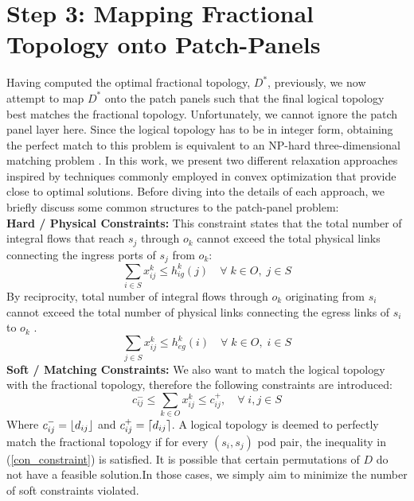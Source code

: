 \documentclass[sigconf]{acmart}
\theoremstyle{definition}
\begin{document}
\section{Step 3: Mapping Fractional Topology onto Patch-Panels}\label{section_patch_panel_mapping}
Having computed the optimal fractional topology, $D^*$, previously, we now attempt to map $D^*$ onto the patch panels such that the final logical topology best matches the fractional topology. Unfortunately, we cannot ignore the patch panel layer here. Since the logical topology has to be in integer form, obtaining the perfect match to this problem is equivalent to an NP-hard three-dimensional matching problem \cite{irving1994three, foerster2018characterizing}. In this work, we present two different relaxation approaches inspired by techniques commonly employed in convex optimization that provide close to optimal solutions. Before diving into the details of each approach, we briefly discuss some common structures to the patch-panel problem:
\textbf{\\Hard / Physical Constraints: } This constraint states that the total number of integral flows that reach $s_j$ through $o_k$ cannot exceed the total physical links connecting the ingress ports of $s_j$ from $o_k$:
\begin{equation}\label{phy_constraint1}
    \sum_{i \in S} x_{ij}^k \leq h_{ig}^k(j) \quad \forall \; k \in O, \; j \in S
\end{equation}
By reciprocity, total number of integral flows through $o_k$ originating from $s_i$ cannot exceed the total number of physical links connecting the egress links of $s_i$ to $o_k$ .
\begin{equation}\label{phy_constraint2}
    \sum_{j \in S} x_{ij}^k \leq h_{eg}^k(i) \quad \forall \; k \in O, \; i \in S
\end{equation}
\textbf{Soft / Matching Constraints: } We also want to match the logical topology with the fractional topology, therefore the following constraints are introduced:
\begin{equation}\label{con_constraint}
    c_{ij}^- \leq \sum_{k \in O} x_{ij}^k \leq c_{ij}^+, \quad \forall \; i,j \in S
\end{equation}
Where $c_{ij}^- = \left\lfloor d_{ij} \right\rfloor$ and $c_{ij}^+ = \left\lceil d_{ij} \right\rceil$. A logical topology is deemed to perfectly match the fractional topology if for every $(s_i, s_j)$ pod pair, the inequality in (\ref{con_constraint}) is satisfied. It is possible that certain permutations of $D$ do not have a feasible solution.In those cases, we simply aim to minimize the number of soft constraints violated.\\
\end{document}
